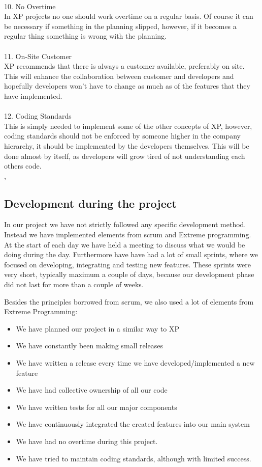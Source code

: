  \\
10. No Overtime\\
In XP projects no one should work overtime on a regular basis. Of course it can be necessary if something in the planning slipped, however, if it becomes a regular thing something is wrong with the planning.\\
 \\
11. On-Site Customer\\
XP recommends that there is always a customer available, preferably on site. This will enhance the collaboration between customer and developers and hopefully developers won't have to change as much as of the features that they have implemented.\\
 \\
12. Coding Standards\\
This is simply needed to implement some of the other concepts of XP, however, coding standards should not be enforced by someone higher in the company hierarchy, it should be implemented by the developers themselves. This will be done almost by itself, as developers will grow tired of not understanding each others code. \\

\cite{xp}, \cite{xp2}
\subsection{Development during the project}
In our project we have not strictly followed any specific development method. Instead we have implemented elements from scrum and Extreme programming. At the start of each day we have held a meeting to discuss what we would be doing during the day. Furthermore have have had a lot of small sprints, where we focused on developing, integrating and testing new features. These sprints were very short, typically maximum a couple of days, because our development phase did not last for more than a couple of weeks.

Besides the principles borrowed from scrum, we also used a lot of elements from Extreme Programming:
\begin{itemize}
\item We have planned our project in a similar way to XP
\item We have constantly been making small releases 
\item We have written a release every time we have developed/implemented a new feature
\item We have had collective ownership of all our code
\item We have written tests for all our major components 
\item We have continuously integrated the created features into our main system
\item We have had no overtime during this project.
\item We have tried to maintain coding standards, although with limited success.
\end{itemize}

